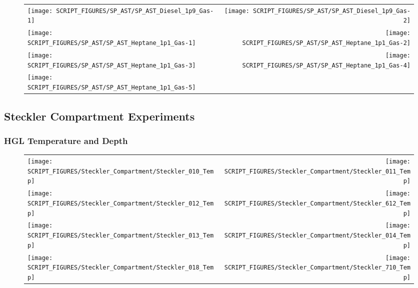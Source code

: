 \newpage

\begin{figure}[!ht]
\begin{tabular*}{\textwidth}{l@{\extracolsep{\fill}}r}
\texttt{[image: SCRIPT\_FIGURES/SP\_AST/SP\_AST\_Diesel\_1p9\_Gas-1]}   &  \texttt{[image: SCRIPT\_FIGURES/SP\_AST/SP\_AST\_Diesel\_1p9\_Gas-2]}    \\
\texttt{[image: SCRIPT\_FIGURES/SP\_AST/SP\_AST\_Heptane\_1p1\_Gas-1]}  &  \texttt{[image: SCRIPT\_FIGURES/SP\_AST/SP\_AST\_Heptane\_1p1\_Gas-2]}    \\
\texttt{[image: SCRIPT\_FIGURES/SP\_AST/SP\_AST\_Heptane\_1p1\_Gas-3]}  &  \texttt{[image: SCRIPT\_FIGURES/SP\_AST/SP\_AST\_Heptane\_1p1\_Gas-4]}     \\
\texttt{[image: SCRIPT\_FIGURES/SP\_AST/SP\_AST\_Heptane\_1p1\_Gas-5]}  &
\end{tabular*}
\label{SP_Diesel_1p9_Gas}
\end{figure}

\clearpage

\subsection{Steckler Compartment Experiments}

\subsubsection{HGL Temperature and Depth}

\begin{figure}[!ht]
\begin{tabular*}{\textwidth}{l@{\extracolsep{\fill}}r}
\texttt{[image: SCRIPT\_FIGURES/Steckler\_Compartment/Steckler\_010\_Temp]} &
\texttt{[image: SCRIPT\_FIGURES/Steckler\_Compartment/Steckler\_011\_Temp]} \\
\texttt{[image: SCRIPT\_FIGURES/Steckler\_Compartment/Steckler\_012\_Temp]} &
\texttt{[image: SCRIPT\_FIGURES/Steckler\_Compartment/Steckler\_612\_Temp]} \\
\texttt{[image: SCRIPT\_FIGURES/Steckler\_Compartment/Steckler\_013\_Temp]} &
\texttt{[image: SCRIPT\_FIGURES/Steckler\_Compartment/Steckler\_014\_Temp]} \\
\texttt{[image: SCRIPT\_FIGURES/Steckler\_Compartment/Steckler\_018\_Temp]} &
\texttt{[image: SCRIPT\_FIGURES/Steckler\_Compartment/Steckler\_710\_Temp]}
\end{tabular*}
\label{Steckler_Temp_1}
\end{figure}

